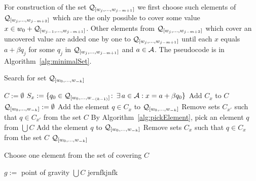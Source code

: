 \begin{upravit}
For construction of the set $\mathcal{Q}_{[w_j,\dots, w_{j-m+1}]}$ we first choose such elements of $\mathcal{Q}_{[w_j,\dots, w_{j-m+2}]}$ which are the only possible to cover some value $x \in w_0 + \mathcal{Q}_{[w_{j-1},\dots, w_{j-m+1}]}$. Other elements from $\mathcal{Q}_{[w_j,\dots, w_{j-m+2}]}$ which cover an uncovered value are added one by one to $\mathcal{Q}_{[w_j,\dots, w_{j-m+1}]}$ until each $x$ equals $a+\beta q_j$ for some $q_j$ in $\mathcal{Q}_{[w_j,\dots, w_{j-m+1}]}$ and $a\in\mathcal{A}$. The pseudocode is in Algorithm~\ref{alg:minimalSet}. 

\begin{algorithm}
  \caption{Search for set $\mathcal{Q}_{[w_{0}, \dots, w_{-k}]}$ }
    \label{alg:minimalSet}
  \begin{algorithmic}[1]
    \STATE $C:=\emptyset$
    	\STATE $S_x:= \{q_0\in\mathcal{Q}_{[w_{0}, \dots, w_{-(k-1)}]}\colon\, \exists \, a\in\mathcal{A}: x=a+\beta q_0 \}$
        \STATE Add $C_x$ to $C$
    \ENDFOR
    \STATE $\mathcal{Q}_{[w_{0}, \dots, w_{-k}]}:=\emptyset$
    		\STATE Add the element $q\in C_x$ to $\mathcal{Q}_{[w_{0}, \dots, w_{-k}]}$
	        \STATE Remove sets $C_{x'}$ such that $q \in C_{x'}$  from the set $C$ 
	    \ENDIF
	\ENDFOR
        \STATE By Algorithm~\ref{alg:pickElement},  pick an element $q$ from $\bigcup C$
        \STATE Add the element $q$ to $\mathcal{Q}_{[w_{0}, \dots, w_{-k}]}$
        \STATE Remove sets $C_x$ such that $q \in C_x$  from the set $C$ 
    \ENDWHILE
    \RETURN $\mathcal{Q}_{[w_{0}, \dots, w_{-k}]}$
  \end{algorithmic}
\end{algorithm}


\begin{algorithm}
  \caption{Choose one element from the set of covering $C$ }
    \label{alg:pickElement}
  \begin{algorithmic}[1]
    	\STATE $g:=$ point of gravity $\bigcup C$ jernfkjnfk
    	\STATE 
    	\RETURN 
    \ENDIF

  \end{algorithmic}
\end{algorithm}



\end{upravit}

